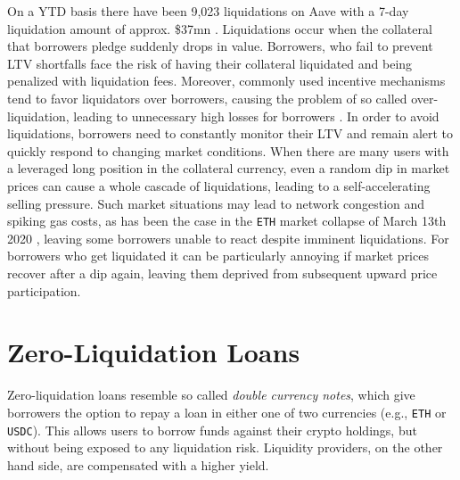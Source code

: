 \documentclass[a4paper]{article}
\begin{document}
On a YTD basis there have been 9,023 liquidations on Aave with a 7-day liquidation amount of approx. \$37mn \cite{dune}. Liquidations occur when the collateral that borrowers pledge suddenly drops in value. Borrowers, who fail to prevent LTV shortfalls face the risk of having their collateral liquidated and being penalized with liquidation fees. Moreover, commonly used incentive mechanisms tend to favor liquidators over borrowers, causing the problem of so called over-liquidation, leading to unnecessary high losses for borrowers \cite{qin}. In order to avoid liquidations, borrowers need to constantly monitor their LTV and remain alert to quickly respond to changing market conditions. When there are many users with a leveraged long position in the collateral currency, even a random dip in market prices can cause a whole cascade of liquidations, leading to a self-accelerating selling pressure. Such market situations may lead to network congestion and spiking gas costs, as has been the case in the \verb|ETH| market collapse of March 13th 2020 \cite{qin}, leaving some borrowers unable to react despite imminent liquidations. For borrowers who get liquidated it can be particularly annoying if market prices recover after a dip again, leaving them deprived from subsequent upward price participation.\\



\section{Zero-Liquidation Loans}
\label{sec:zero_liquidation_loans}
Zero-liquidation loans resemble so called \emph{double currency notes}, which give borrowers the option to repay a loan in either one of two currencies (e.g., \verb|ETH| or \verb|USDC|). This allows users to borrow funds against their crypto holdings, but without being exposed to any liquidation risk. Liquidity providers, on the other hand side, are compensated with a higher yield.\\
\end{document}
